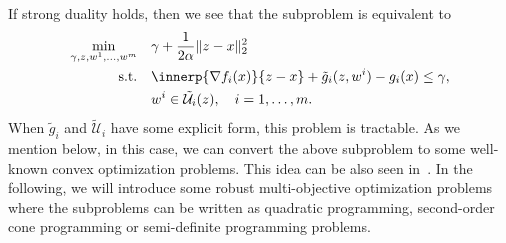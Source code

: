 \documentclass[../../main]{subfiles}
\begin{document}
If strong duality holds, then we see that the subproblem  is equivalent to
\begin{equation} \label{eq:subproblem}
    \begin{aligned}
        \min_{\gamma, z, w^1, \dots, w^m} \quad   &\gamma + \frac{1}{2 \alpha} \norm{z - x}_2^2   \\ 
        \st    \quad   &\innerp{\nabla f_i(x)}{z - x} + \tilde{g}_i (z, w^i) - g_i(x) \leq \gamma,\\
                       &w^i \in \tilde{\mathcal{U}}_i (z), \quad i = 1,\ldots,m .
    \end{aligned}
\end{equation}
When $\tilde{g}_i$ and $\tilde{\mathcal{U}}_i$ have some explicit form, this problem is tractable.
As we mention below, in this case, we can convert the above subproblem to some well-known convex optimization problems.
This idea can be also seen in~\cite{Ben-tal1998}.
In the following, we will introduce some robust multi-objective optimization problems where the subproblems can be written as quadratic programming, second-order cone programming or semi-definite programming problems.






\end{document}
